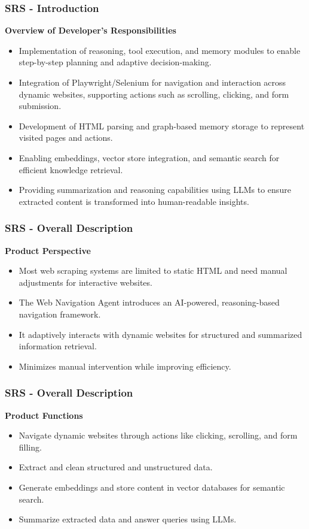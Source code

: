 \documentclass{beamer}
\begin{document}
\begin{frame}
\frametitle{SRS - Introduction}
\textbf{Overview of Developer’s Responsibilities}
\begin{itemize}
    \item Implementation of reasoning, tool execution, and memory modules to enable step-by-step planning and adaptive decision-making.
    \item Integration of Playwright/Selenium for navigation and interaction across dynamic websites, supporting actions such as scrolling, clicking, and form submission.
    \item Development of HTML parsing and graph-based memory storage to represent visited pages and actions.
    \item Enabling embeddings, vector store integration, and semantic search for efficient knowledge retrieval.
    \item Providing summarization and reasoning capabilities using LLMs to ensure extracted content is transformed into human-readable insights.
\end{itemize}
\end{frame}


\begin{frame}
\frametitle{SRS - Overall Description}
\textbf{Product Perspective}
\begin{itemize}
    \item Most web scraping systems are limited to static HTML and need manual adjustments for interactive websites.
    \item The Web Navigation Agent introduces an AI-powered, reasoning-based navigation framework.
    \item It adaptively interacts with dynamic websites for structured and summarized information retrieval.
    \item Minimizes manual intervention while improving efficiency.
\end{itemize}
\end{frame}

\begin{frame}
\frametitle{SRS - Overall Description}
\textbf{Product Functions}
\begin{itemize}
    \item Navigate dynamic websites through actions like clicking, scrolling, and form filling.
    \item Extract and clean structured and unstructured data.
    \item Generate embeddings and store content in vector databases for semantic search.
    \item Summarize extracted data and answer queries using LLMs.
\end{itemize}
\end{frame}
\end{document}
